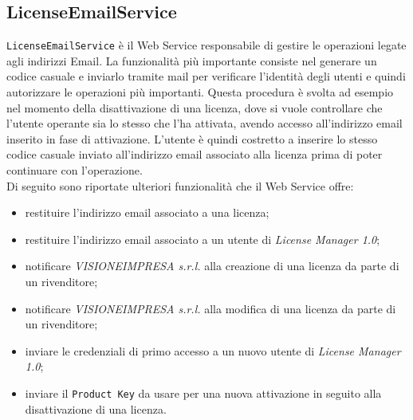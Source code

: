 \subsection{LicenseEmailService}
\texttt{LicenseEmailService} è il Web Service responsabile di gestire le operazioni legate agli indirizzi Email. La funzionalità più importante consiste nel generare un codice casuale e inviarlo tramite mail per verificare l'identità degli utenti e quindi autorizzare le operazioni più importanti. Questa procedura è svolta ad esempio nel momento della disattivazione di una licenza, dove si vuole controllare che l'utente operante sia lo stesso che l'ha attivata, avendo accesso all'indirizzo email inserito in fase di attivazione. L'utente è quindi costretto a inserire lo stesso codice casuale inviato all'indirizzo email associato alla licenza prima di poter continuare con l'operazione.\\
Di seguito sono riportate ulteriori funzionalità che il Web Service offre:
\begin{itemize}
\item restituire l'indirizzo email associato a una licenza;
\item restituire l'indirizzo email associato a un utente di \textit{License Manager 1.0};
\item notificare \textit{VISIONEIMPRESA s.r.l.} alla creazione di una licenza da parte di un rivenditore;
 \item notificare \textit{VISIONEIMPRESA s.r.l.} alla modifica di una licenza da parte di un rivenditore;
 \item inviare le credenziali di primo accesso a un nuovo utente di \textit{License Manager 1.0};
 \item inviare il \texttt{Product Key} da usare per una nuova attivazione in seguito alla disattivazione di una licenza.
\end{itemize}

